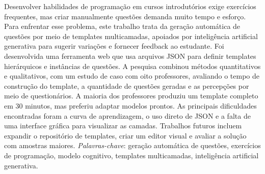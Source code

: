 \begin{resumo}
Desenvolver habilidades de programação em cursos introdutórios exige exercícios frequentes, mas criar manualmente questões demanda muito tempo e esforço. Para enfrentar esse problema, este trabalho trata da geração automática de questões por meio de templates multicamadas, apoiados por inteligência artificial generativa para sugerir variações e fornecer feedback ao estudante. Foi desenvolvida uma ferramenta web que usa arquivos JSON para definir templates hierárquicos e instâncias de questões. A pesquisa combinou métodos quantitativos e qualitativos, com um estudo de caso com oito professores, avaliando o tempo de construção do template, a quantidade de questões geradas e as percepções por meio de questionários. A maioria dos professores produziu um template completo em 30 minutos, mas preferiu adaptar modelos prontos. As principais dificuldades encontradas foram a curva de aprendizagem, o uso direto de JSON e a falta de uma interface gráfica para visualizar as camadas. Trabalhos futuros incluem expandir o repositório de templates, criar um editor visual e avaliar a solução com amostras maiores.
  \bigbreak
  \noindent
  \textit{Palavras-chave}: geração automática de questões, exercícios de programação, modelo cognitivo, templates multicamadas, inteligência artificial generativa.
\end{resumo}